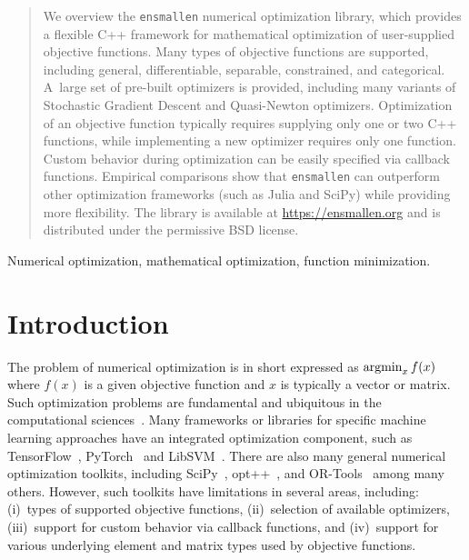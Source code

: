 \documentclass[twoside,11pt]{article}
\begin{document}
\begin{abstract}%
We overview the {\tt ensmallen} numerical optimization library,
which provides a flexible C++ framework
for mathematical optimization of user-supplied objective functions.
Many types of objective functions are supported,
including general, differentiable, separable, constrained, and categorical.
A~large set of pre-built optimizers is provided,
including many variants of Stochastic Gradient Descent and Quasi-Newton optimizers.
Optimization of an objective function typically requires supplying only one or two C++ functions,
while implementing a new optimizer requires only one function. %
Custom behavior during optimization can be easily specified via callback functions.
Empirical comparisons show that {\tt ensmallen}
can outperform other optimization frameworks (such as Julia and SciPy)
while providing more flexibility.
The library is available at \url{https://ensmallen.org}
and is distributed under the permissive BSD license.

\end{abstract}

\begin{keywords}
  Numerical optimization, mathematical optimization, function minimization.
\end{keywords}

\section{Introduction}
\label{sec:introduction}

The problem of numerical optimization is in short expressed as
$\operatornamewithlimits{argmin}_x f(x)$
where $f(x)$ is a given objective function and $x$ is typically a vector or matrix.
Such optimization problems are fundamental and ubiquitous in the computational sciences~\citep{Nocedal_2006}.
Many frameworks or libraries for specific machine learning approaches
have an integrated optimization component,
such as
TensorFlow~\citep{tensorflow2015-whitepaper},
PyTorch~\citep{NEURIPS2019_9015}
and LibSVM~\citep{libsvm2011}.
There are also many general numerical optimization toolkits,
including SciPy~\citep{2019arXiv190710121V},
opt++~\citep{meza1994opt++},
and 
OR-Tools~\citep{ortools} among many others.
However, such toolkits have limitations in several areas,
including:
(i)~types of supported objective functions,
(ii)~selection of available optimizers,
(iii)~support for custom behavior via callback functions,
and
(iv)~support for various underlying element and matrix types used by objective functions.
\end{document}
